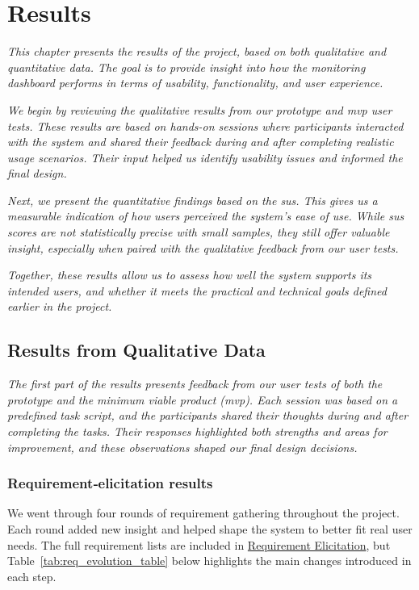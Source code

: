 \chapter{Results}
\label{ch:results}
\textit{This chapter presents the results of the project, based on both qualitative and quantitative data. The goal is to provide insight into how the monitoring dashboard performs in terms of usability, functionality, and user experience.}

\textit{We begin by reviewing the qualitative results from our prototype and \acrshort{mvp} user tests. These results are based on hands-on sessions where participants interacted with the system and shared their feedback during and after completing realistic usage scenarios. Their input helped us identify usability issues and informed the final design.}

\textit{Next, we present the quantitative findings based on the \acrfull{sus}. This gives us a measurable indication of how users perceived the system’s ease of use. While \acrshort{sus} scores are not statistically precise with small samples, they still offer valuable insight, especially when paired with the qualitative feedback from our user tests.}

\textit{Together, these results allow us to assess how well the system supports its intended users, and whether it meets the practical and technical goals defined earlier in the project.}

\section{Results from Qualitative Data}
\textit{The first part of the results presents feedback from our user tests of both the prototype and the minimum viable product (\acrshort{mvp}). Each session was based on a predefined task script, and the participants shared their thoughts during and after completing the tasks. Their responses highlighted both strengths and areas for improvement, and these observations shaped our final design decisions.}

\subsection{Requirement‑elicitation results}
\label{subsec:req_results}

We went through four rounds of requirement gathering throughout the project. Each round added new insight and helped shape the system to better fit real user needs. The full requirement lists are included in \hyperref[sec:req_gathering]{Requirement Elicitation}, but Table~\ref{tab:req_evolution_table} below highlights the main changes introduced in each step.

